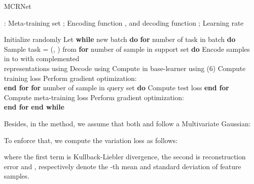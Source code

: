 \documentclass[10pt,conference,a4paper]{IEEEtran}
\begin{document}
\begin{algorithm}
	\caption{MCRNet }
	\label{alg:A}
	: Meta-training set ; Encoding function , and decoding function ; Learning rate  
	\begin{algorithmic}[1]
		\STATE Initialize  randomly
		\STATE Let 
		\STATE \textbf{while} new batch \textbf{do}
		\STATE \hspace{2ex}\textbf{for} number of task in batch \textbf{do}
		\STATE \hspace{4ex}Sample task  = (, ) from 
		\STATE \hspace{4ex}\textbf{for} number of sample in support set  \textbf{do}
\STATE \hspace{6ex}Encode samples in  to  with complemented\\
		\hspace{6ex}representations using 
		\STATE \hspace{6ex}Decode  using  
		\STATE \hspace{6ex}Compute  in base-learner using (6)
		\STATE \hspace{6ex}Compute training loss 
		\STATE \hspace{6ex}Perform gradient optimization:\\
		\hspace{6ex}
		\STATE \hspace{4ex}\textbf{end for}
		\STATE \hspace{4ex}\textbf{for} number of sample in query set  \textbf{do}
		\STATE \hspace{6ex}Compute test loss 
		\STATE \hspace{4ex}\textbf{end for}
		\STATE \hspace{4ex}Compute meta-training loss 
		\STATE \hspace{4ex}Perform gradient optimization:\\
		\hspace{4ex}
		\STATE \hspace{2ex}\textbf{end for}
		\STATE \textbf{end while}
	\end{algorithmic}
\end{algorithm}

Besides, in the method, we assume that both  and  follow a Multivariate Gaussian: 

To enforce that, we compute the variation loss as follows: 

where the first term is Kullback-Liebler divergence, the second is reconstruction error and ,  respectively denote the -th mean and standard deviation of feature samples.
\end{document}
